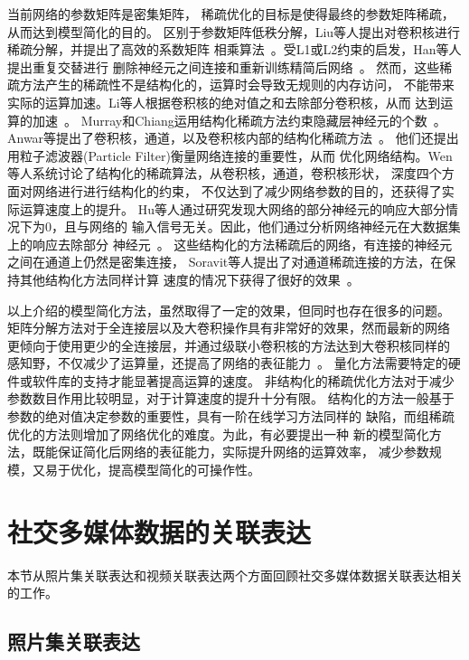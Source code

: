 当前网络的参数矩阵是密集矩阵， 稀疏优化的目标是使得最终的参数矩阵稀疏，
从而达到模型简化的目的。
区别于参数矩阵低秩分解，Liu等人提出对卷积核进行稀疏分解，并提出了高效的系数矩阵
相乘算法~\cite{liu2015sparse}。受L1或L2约束的启发，Han等人提出重复交替进行
删除神经元之间连接和重新训练精简后网络~\cite{han2015learning,han2015deep}。
然而，这些稀疏方法产生的稀疏性不是结构化的，运算时会导致无规则的内存访问，
不能带来实际的运算加速。Li等人根据卷积核的绝对值之和去除部分卷积核，从而
达到运算的加速~\cite{li2016pruning}。
Murray和Chiang运用结构化稀疏方法约束隐藏层神经元的个数~\cite{murray2015auto}。
Anwar等提出了卷积核，通道，以及卷积核内部的结构化稀疏方法~\cite{anwar2015structured}。
他们还提出用粒子滤波器(Particle Filter)衡量网络连接的重要性，从而
优化网络结构。Wen等人系统讨论了结构化的稀疏算法，从卷积核，通道，卷积核形状，
深度四个方面对网络进行进行结构化的约束，
不仅达到了减少网络参数的目的，还获得了实际运算速度上的提升。
Hu等人通过研究发现大网络的部分神经元的响应大部分情况下为0，且与网络的
输入信号无关。因此，他们通过分析网络神经元在大数据集上的响应去除部分
神经元~\cite{hu2016network}。
这些结构化的方法稀疏后的网络，有连接的神经元之间在通道上仍然是密集连接，
Soravit等人提出了对通道稀疏连接的方法，在保持其他结构化方法同样计算
速度的情况下获得了很好的效果~\cite{changpinyo2017power}。

以上介绍的模型简化方法，虽然取得了一定的效果，但同时也存在很多的问题。
矩阵分解方法对于全连接层以及大卷积操作具有非常好的效果，然而最新的网络
更倾向于使用更少的全连接层，并通过级联小卷积核的方法达到大卷积核同样的
感知野，不仅减少了运算量，还提高了网络的表征能力~\cite{szegedy2016rethinking}。
量化方法需要特定的硬件或软件库的支持才能显著提高运算的速度。
非结构化的稀疏优化方法对于减少参数数目作用比较明显，对于计算速度的提升十分有限。
结构化的方法一般基于参数的绝对值决定参数的重要性，具有一阶在线学习方法同样的
缺陷，而组稀疏优化的方法则增加了网络优化的难度。为此，有必要提出一种
新的模型简化方法，既能保证简化后网络的表征能力，实际提升网络的运算效率，
减少参数规模，又易于优化，提高模型简化的可操作性。

\section{社交多媒体数据的关联表达}
本节从照片集关联表达和视频关联表达两个方面回顾社交多媒体数据关联表达相关的工作。

\subsection{照片集关联表达}

